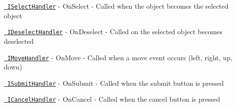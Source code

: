 \begin{DoxyItemize}
\item \href{xref:UnityEngine.EventSystems.ISelectHandler}{\texttt{ ISelect\+Handler}} -\/ On\+Select -\/ Called when the object becomes the selected object
\item \href{xref:UnityEngine.EventSystems.IDeselectHandler}{\texttt{ IDeselect\+Handler}} -\/ On\+Deselect -\/ Called on the selected object becomes deselected
\item \href{xref:UnityEngine.EventSystems.IMoveHandler}{\texttt{ IMove\+Handler}} -\/ On\+Move -\/ Called when a move event occurs (left, right, up, down)
\item \href{xref:UnityEngine.EventSystems.ISubmitHandler}{\texttt{ ISubmit\+Handler}} -\/ On\+Submit -\/ Called when the submit button is pressed
\item \href{xref:UnityEngine.EventSystems.ICancelHandler}{\texttt{ ICancel\+Handler}} -\/ On\+Cancel -\/ Called when the cancel button is pressed 
\end{DoxyItemize}